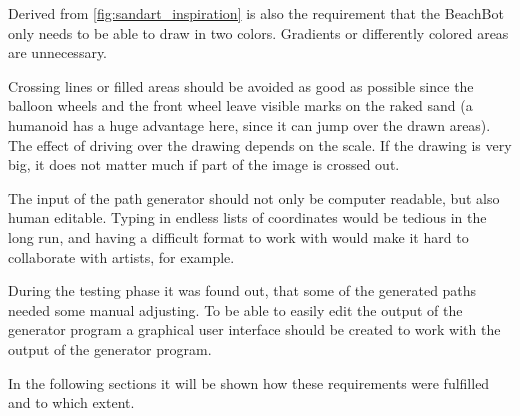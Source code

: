 Derived from \autoref{fig:sandart_inspiration} is also the requirement that the BeachBot only needs to be able to draw in two colors. Gradients or differently colored areas are unnecessary.

Crossing lines or filled areas should be avoided as good as possible since the balloon wheels and the front wheel leave visible marks on the raked sand (a humanoid has a huge advantage here, since it can jump over the drawn areas). The effect of driving over the drawing depends on the scale. If the drawing is very big, it does not matter much if part of the image is crossed out. 

The input of the path generator should not only be computer readable, but also human editable. Typing in endless lists of coordinates would be tedious in the long run, and having a difficult format to work with would make it hard to collaborate with artists, for example. 

During the testing phase it was found out, that some of the generated paths needed some manual adjusting. To be able to easily edit the output of the generator program a graphical user interface should be created to work with the output of the generator program. 

In the following sections it will be shown how these requirements were fulfilled and to which extent.